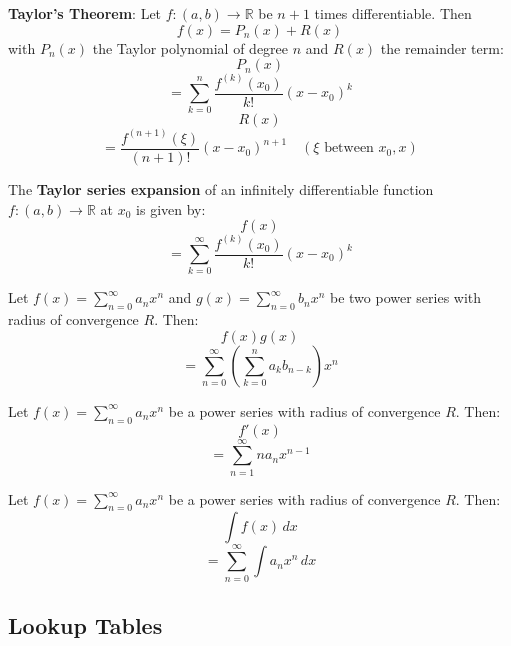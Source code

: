 \begin{theorem}
    \textbf{Taylor's Theorem}: Let $f: (a, b) \to \mathbb{R}$ be $n+1$ times differentiable. Then 
    $$f(x) = P_n(x) + R(x)$$
    with $P_n(x)$ the Taylor polynomial of degree $n$ and $R(x)$ the remainder term:
    $$P_n(x)$$
    $$= \sum_{k=0}^n \frac{f^{(k)}(x_0)}{k!}(x-x_0)^k$$
    $$R(x)$$
    $$= \frac{f^{(n+1)}(\xi)}{(n+1)!}(x-x_0)^{n+1} \quad (\xi \text{ between } x_0, x)$$
\end{theorem}

\begin{definition}
    The \textbf{Taylor series expansion} of an infinitely differentiable function $f: (a, b) \to \mathbb{R}$ at $x_0$ is given by:
    $$f(x)$$
    $$= \sum_{k=0}^\infty \frac{f^{(k)}(x_0)}{k!}(x-x_0)^k$$
\end{definition}

\begin{theorem}
    Let $f(x) = \sum_{n=0}^\infty a_n x^n$ and $g(x) = \sum_{n=0}^\infty b_n x^n$ be two power series with radius of convergence $R$. Then:
    $$f(x)g(x)$$
    $$= \sum_{n=0}^\infty \left(\sum_{k=0}^n a_k b_{n-k}\right) x^n$$
\end{theorem}

\begin{theorem}
    Let $f(x) = \sum_{n=0}^\infty a_n x^n$ be a power series with radius of convergence $R$. Then:
    $$f'(x)$$
    $$= \sum_{n=1}^\infty n a_n x^{n-1}$$
\end{theorem}

\begin{theorem}
    Let $f(x) = \sum_{n=0}^\infty a_n x^n$ be a power series with radius of convergence $R$. Then:
    $$\int f(x) \, dx$$
    $$= \sum_{n=0}^\infty \int a_n x^n \, dx$$
\end{theorem}

\subsection{Lookup Tables}

